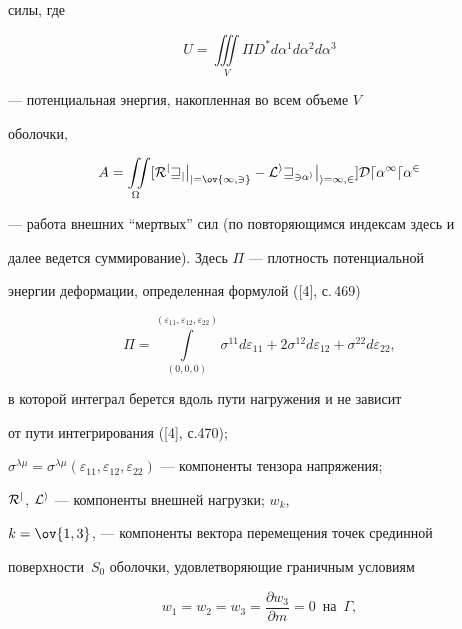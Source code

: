 силы, где 


\begin{equation} 


U=\iiint\limits_V \Pi D^* d\alpha^1 d\alpha^2 d\alpha^3 


\end{equation} 


--- потенциальная энергия, накопленная во всем объеме $V$ 


оболочки, 


\begin{equation} 


A=\iint\limits_\Omega[\cal R^j w_j\big|_{j=\ov{1,3}}- 


\cal L^i w_{3\alpha^i}\big|_{i=1,2}]D d\alpha^1 d\alpha^2 


\end{equation} 


--- работа внешних ``мертвых'' сил (по повторяющимся индексам здесь и 


далее ведется суммирование). Здесь $\Pi$ --- плотность потенциальной 


энергии деформации, определенная формулой ([4], с.\,469) 


\begin{equation} 


\Pi=\int\limits^{(\varepsilon_{11}, 


\varepsilon_{12},\varepsilon_{22})}_{(0,0,0)} 


\sigma^{11}d\varepsilon_{11}+2\sigma^{12} 


d\varepsilon_{12}+\sigma^{22}d\varepsilon_{22}, 


\end{equation} 


в которой интеграл берется вдоль пути нагружения и не зависит 


от пути интегрирования ([4], с.470); 


$\sigma^{\lambda\mu}=\sigma^{\lambda\mu}(\varepsilon_{11}, 


\varepsilon_{12},\varepsilon_{22})$ --- компоненты тензора напряжения; 


$\cal R^j$, $\cal L^i$ --- компоненты внешней нагрузки; $w_k$, 


$k=\ov{1,3}$, --- компоненты вектора перемещения точек срединной 


поверхности~$S_0$ оболочки, удовлетворяющие граничным условиям 


\begin{equation} 


w_1=w_2=w_3=\frac{\partial w_3}{\partial m}=0\ \; 


\text{на} \ \; \Gamma, 


\end{equation} 


